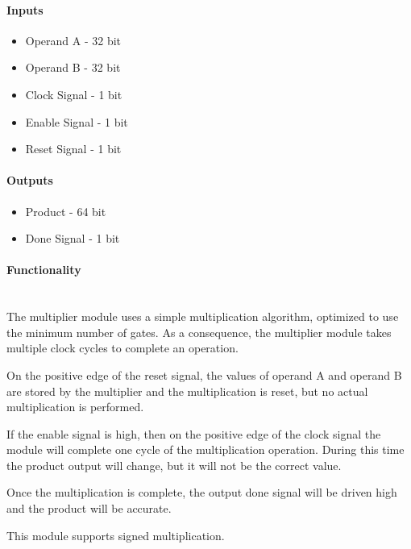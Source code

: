 \documentclass{article}
\begin{document}
    \paragraph{Inputs}
    \begin{itemize}
        \item Operand A - 32 bit
        \item Operand B - 32 bit
        \item Clock Signal - 1 bit
        \item Enable Signal - 1 bit
        \item Reset Signal - 1 bit
    \end{itemize}

    \paragraph{Outputs}
    \begin{itemize}
        \item Product - 64 bit
        \item Done Signal - 1 bit
    \end{itemize}

    \paragraph{Functionality}
    \hfill\\
    The multiplier module uses a simple multiplication algorithm, optimized
    to use the minimum number of gates. As a consequence, the multiplier
    module takes multiple clock cycles to complete an operation.

    On the positive edge of the reset signal, the values of operand A
    and operand B are stored by the multiplier and the multiplication is
    reset, but no actual multiplication is performed.

    If the enable signal is high, then on the positive edge of the clock
    signal the module will complete one cycle of the multiplication 
    operation. During this time the product output will change, but it will
    not be the correct value.

    Once the multiplication is complete, the output done signal will be driven
    high and the product will be accurate.

    This module supports signed multiplication.
\end{document}

